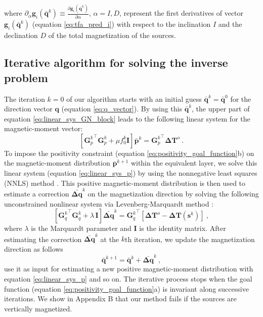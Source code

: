where 
$\partial_{\alpha} \mathbf{g}_{i}(\bar{\mathbf{q}}^{k}) \equiv 
\frac{\partial \mathbf{g}_{i}(\bar{\mathbf{q}}^{k})}{\partial \alpha}$, $\alpha= I, D$, 
represent the first derivatives of vector 
$\mathbf{g}_{i}(\bar{\mathbf{q}}^{k})$ (equation \ref{eq:tfa_pred_i}) with respect to the 
inclination $I$ and the declination $D$ of the total magnetization of the sources.

\subsection{Iterative algorithm for solving the inverse problem}

The iteration $k = 0$ of our algorithm starts with an initial guess 
$\bar{\mathbf{q}}^{k} = \bar{\mathbf{q}}^{0}$ for the direction vector $\mathbf{q}$ 
(equation \ref{eq:q_vector}).
By using this $\bar{\mathbf{q}}^{k}$, the upper part of equation 
\ref{eq:linear_sys_GN_block} leads to the following linear system for the magnetic-moment 
vector:
\begin{equation}
\left[ {\mathbf{G}_{p}^{k}}^{\top} \mathbf{G}_{p}^{k} + 
\mu f_{0}^{k} \mathbf{I} \right] \bar{\mathbf{p}}^{k} = {\mathbf{G}_{p}^{k}}^{\top} \mathbf{\Delta T}^{o} \: .
\label{eq:linear_sys_p}
\end{equation}
To impose the positivity constraint (equation \ref{eq:positivity_goal_function}b) on the 
magnetic-moment distribution $\bar{\mathbf{p}}^{k+1}$ within the equivalent layer, 
we solve this linear system (equation \ref{eq:linear_sys_p}) by using the nonnegative least 
squares (NNLS) method \citep{lawson_hanson_1974, silvadias_etal_2007}.
This positive magnetic-moment distribution is then used to estimate a correction 
$\bar{\mathbf{\Delta q}}^{k}$ on the magnetization direction by solving the following 
unconstrained nonlinear system via Levenberg-Marquardt method \citep{aster2005}:
\begin{equation}
\left[ {\mathbf{G}_{q}^{k}}^{\top} \mathbf{G}_{q}^{k} + \lambda \, \mathbf{I} \right] 
\bar{\mathbf{\Delta q}}^{k} = {\mathbf{G}_{q}^{k}}^{\top} 
\left[ \mathbf{\Delta T}^{o} - \mathbf{\Delta T} (\mathbf{s}^{k}) \right] \: ,
\label{eq:linear_sys_q}
\end{equation}
where $\lambda$ is the Marquardt parameter and $\mathbf{I}$ is the identity matrix. 
After estimating the correction $\bar{\mathbf{\Delta q}}^{k}$ 
at the $k$th iteration, we update the magnetization direction as follows
\begin{equation}
\bar{\mathbf{q}}^{k+1} = \bar{\mathbf{q}}^{k} + \bar{\mathbf{\Delta q}}^{k} \: ,
\label{eq:q_next}
\end{equation}
use it as input for estimating a new positive magnetic-moment distribution 
with equation \ref{eq:linear_sys_p} and so on.
The iterative process stops when the goal function (equation \ref{eq:positivity_goal_function}a) 
is invariant along successive iterations. 
We show in Appendix B that our method fails if the sources are vertically magnetized.

